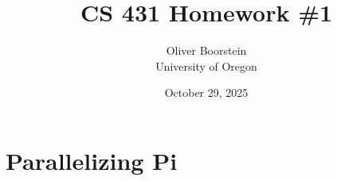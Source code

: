 \documentclass[11pt]{article}
\title{CS 431 Homework \#1}
\author{Oliver Boorstein \\ University of Oregon}
\date{October 29, 2025}
\begin{document}
\twocolumn[
  \maketitle
  \vspace{-1em}
]
\section{Parallelizing Pi}
\end{document}
